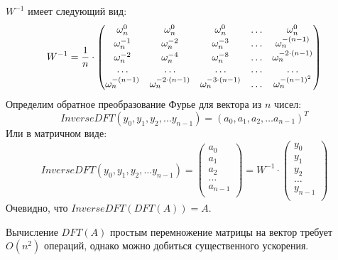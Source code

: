 $W^{-1}$ имеет следующий вид:
$$ W^{-1} = {1 \over n} \cdot \begin{pmatrix}
{\omega}_{n} ^ {0} & {\omega}_{n} ^ {0} & {\omega}_{n} ^ {0} & \dots & {\omega}_{n} ^ {0} \\
{\omega}_{n} ^ {-1} & {\omega}_{n} ^ {-2} & {\omega}_{n} ^ {-3} & \dots & {\omega}_{n} ^ {-(n - 1)} \\
{\omega}_{n} ^ {-2} & {\omega}_{n} ^ {-4} & {\omega}_{n} ^ {-8} & \dots & {\omega}_{n} ^ {-2 \cdot (n - 1)} \\
\dots & \dots & \dots & \dots & \dots \\
{\omega}_{n} ^ {-(n - 1)} & {\omega}_{n} ^ {-2 \cdot (n - 1)} & {\omega}_{n} ^ {-3 \cdot (n - 1)} & \dots & {\omega}_{n} ^ {-(n - 1) ^ 2}
\end{pmatrix}$$
Определим обратное преобразование Фурье для вектора из $n$ чисел:
$$
InverseDFT( y_0, y_1, y_2, \dots y_{n - 1} ) = (a_0, a_1, a_2, \dots a_{n - 1}) ^ T
$$
Или в матричном виде:
$$
InverseDFT( y_0, y_1, y_2, \dots y_{n - 1} ) =
\begin{pmatrix}
a_0 \\
a_1 \\
a_2 \\
\dots \\
a_{n - 1} \\
\end{pmatrix}
=
W^{-1} \cdot
\begin{pmatrix}
y_0 \\
y_1 \\
y_2 \\
\dots \\
y_{n - 1} \\
\end{pmatrix}
$$
Очевидно, что $InverseDFT(DFT(A)) = A$.

Вычисление $DFT(A)$ простым перемножение матрицы на вектор требует $O(n ^ 2)$ операций, однако можно добиться существенного ускорения.

\pagebreak


